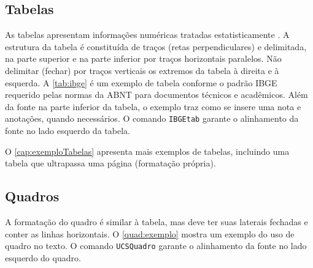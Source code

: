 \subsection{Tabelas}
As tabelas apresentam informações numéricas tratadas
estatisticamente \cite{ibge1993}. A estrutura da tabela é constituída de traços (retas perpendiculares) e delimitada, na parte superior e na parte inferior por traços horizontais paralelos. Não delimitar (fechar) por traços verticais os extremos da tabela à direita e à esquerda. A \autoref{tab:ibge} é um exemplo de tabela conforme o padrão IBGE requerido pelas normas da ABNT para documentos técnicos e acadêmicos. Além da fonte na parte inferior da tabela, o exemplo traz como se insere uma nota e anotações, quando necessários. O comando \texttt{IBGEtab} garante o alinhamento da fonte no lado esquerdo da tabela.  

\begin{table}[!ht]
	\caption{\label{tab:ibge} Um Exemplo de tabela alinhada que pode ser longa ou curta}%
\end{table}
    
O \autoref{cap:exemploTabelas} apresenta mais exemplos de tabelas, incluindo uma tabela que ultrapassa uma página (formatação própria). 

\subsection{Quadros}

A formatação do quadro é similar à tabela, mas deve ter suas laterais fechadas e conter as linhas horizontais. O \autoref{quad:exemplo} mostra um exemplo do uso de quadro no texto. O comando \texttt{UCSQuadro} garante o alinhamento da fonte no lado esquerdo do quadro.   

